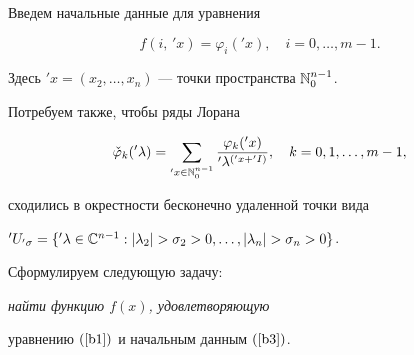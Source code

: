 Введем начальные данные для уравнения


\begin{equation}


f(i,\,'x)=\varphi_i('x), \quad i=0, \dotsc, m-1.


\label{b3}


\end{equation}


Здесь $'x=(x_2,\dotsc,x_n)$ --- точки пространства $\Bbb N_0^{n-1}$.


Потребуем также, чтобы ряды Лорана


\begin{equation}


\label{eq5}


\check\varphi_k('\lambda)=\sum_{'x\in\Bbb


N_0^{n-1}}\frac{\varphi_k('x)}{'\lambda^{('x+'I)}},\quad k=0,1,\dotsc,m-1,


\end{equation}


сходились в окрестности бесконечно удаленной точки вида


$'U_{'\sigma}=\{'\lambda\in\Bbb C^{n-1}:


|\lambda_2|>\sigma_2>0,\dotsc,|\lambda_n|>\sigma_n>0\}$.





Сформулируем следующую задачу: {\it найти функцию $f(x)$, удовлетворяющую


уравнению $(\ref{b1})$ и начальным данным $(\ref{b3})$.}





